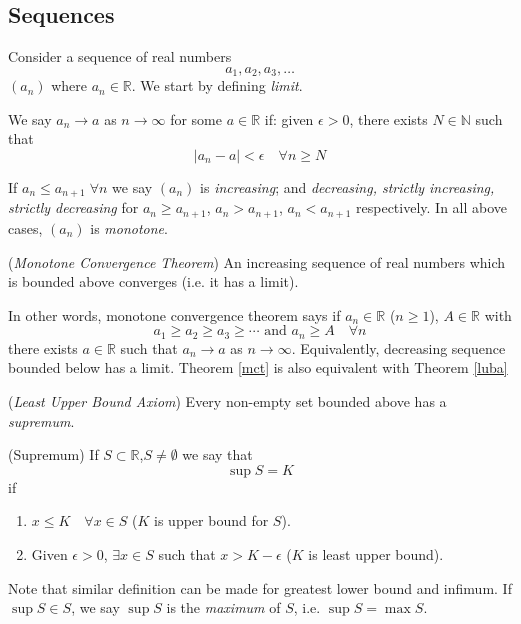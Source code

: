 \documentclass[10pt, a4paper, twoside]{report}
\begin{document}
\subsection{Sequences}
Consider a sequence of real numbers
\[a_1,a_2,a_3,\ldots\]
\((a_n)\) where \(a_n\in\mathbb{R}\).
We start by defining \emph{limit}.
\begin{definition}
    We say \(a_n\to a\) as \(n\to\infty\) for some \(a\in\mathbb{R}\) if: given \(\epsilon>0\), there exists \(N\in\mathbb{N}\) such that
    \[|a_n-a|<\epsilon\quad\forall n\geq N\]
    \label{def:limit}
\end{definition}
If \(a_n\leq a_{n+1}\;\forall n\) we say \((a_n)\) is \emph{increasing}; and \emph{decreasing, strictly increasing, strictly decreasing} for \(a_n\geq a_{n+1}\), \(a_n>a_{n+1}\), \(a_n<a_{n+1}\) respectively. In all above cases, \((a_n)\) is \emph{monotone}.
\begin{theorem}
    (\emph{Monotone Convergence Theorem}) An increasing sequence of real numbers which is bounded above converges (i.e. it has a limit).
    \label{mct}
\end{theorem}
In other words, monotone convergence theorem says if \(a_n\in\mathbb{R}\) (\(n\geq 1\)), \(A\in\mathbb{R}\) with
\[a_1\geq a_2\geq a_3\geq\cdots\text{  and  }a_n\geq A\quad\forall n\]
there exists \(a\in\mathbb{R}\) such that \(a_n\to a\) as \(n\to\infty\). Equivalently, decreasing sequence bounded below has a limit. Theorem \ref{mct} is also equivalent with Theorem \ref{luba}
\begin{theorem}
    (\emph{Least Upper Bound Axiom}) Every non-empty set bounded above has a \emph{supremum}.
    \label{luba}
\end{theorem}
\begin{definition}
    (Supremum) If \(S\subset\mathbb{R}\),\(S\neq\emptyset\) we say that
    \[\sup S=K\]
    if 
    \begin{enumerate}
        \item \(x\leq K\quad\forall x\in S\) (\(K\) is upper bound for \(S\)).
        \item Given \(\epsilon>0\), \(\exists x\in S\) such that \(x>K-\epsilon\) (\(K\) is least upper bound).
    \end{enumerate}
    \label{def:sup}
\end{definition}
Note that similar definition can be made for greatest lower bound and infimum. If \(\sup S\in S\), we say \(\sup S\) is the \emph{maximum} of \(S\), i.e. \(\sup S=\max S\).
\end{document}
